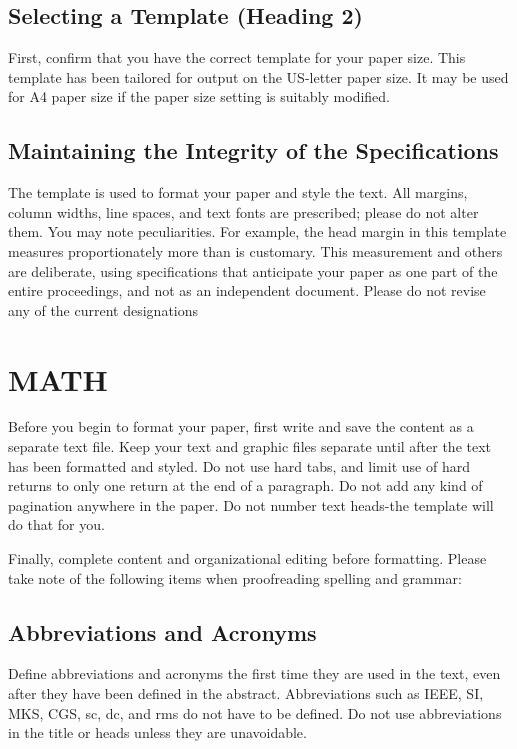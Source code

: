 \documentclass[letterpaper, 10 pt, conference]{ieeeconf}  %
\begin{document}
                                        \subsection{Selecting a Template (Heading 2)}

                                        First, confirm that you have the correct template for your paper size. This template has been tailored for output on the US-letter paper size. 
                                        It may be used for A4 paper size if the paper size setting is suitably modified.

                                        \subsection{Maintaining the Integrity of the Specifications}

                                        The template is used to format your paper and style the text. All margins, column widths, line spaces, and text fonts are prescribed; please do not alter them. You may note peculiarities. For example, the head margin in this template measures proportionately more than is customary. This measurement and others are deliberate, using specifications that anticipate your paper as one part of the entire proceedings, and not as an independent document. Please do not revise any of the current designations

                                        \section{MATH}

                                        Before you begin to format your paper, first write and save the content as a separate text file. Keep your text and graphic files separate until after the text has been formatted and styled. Do not use hard tabs, and limit use of hard returns to only one return at the end of a paragraph. Do not add any kind of pagination anywhere in the paper. Do not number text heads-the template will do that for you.

                                        Finally, complete content and organizational editing before formatting. Please take note of the following items when proofreading spelling and grammar:

                                        \subsection{Abbreviations and Acronyms} Define abbreviations and acronyms the first time they are used in the text, even after they have been defined in the abstract. Abbreviations such as IEEE, SI, MKS, CGS, sc, dc, and rms do not have to be defined. Do not use abbreviations in the title or heads unless they are unavoidable.
\end{document}
